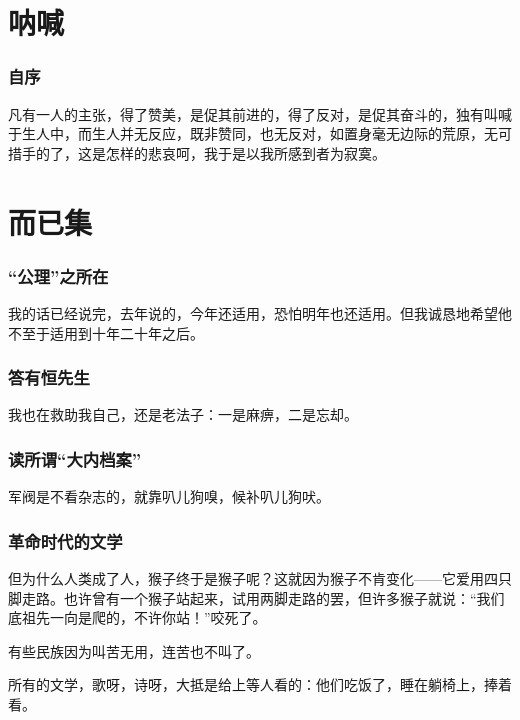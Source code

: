 \documentclass[a4paper]{article}
\begin{document}
    \begin{sloppy}
		\part{呐喊}
		\section{
			自序		
		} {
            \setlength{\parindent}{2em}
			凡有一人的主张，得了赞美，是促其前进的，得了反对，是促其奋斗的，独有叫喊于生人中，而生人并无反应，既非赞同，也无反对，如置身毫无边际的荒原，无可措手的了，这是怎样的悲哀呵，我于是以我所感到者为寂寞。
		}
		
	
        \part{而已集}
        \section{
            “公理”之所在
        } {
            \setlength{\parindent}{2em}
            我的话已经说完，去年说的，今年还适用，恐怕明年也还适用。但我诚恳地希望他不至于适用到十年二十年之后。
        }

        \section{
            答有恒先生
        }
        我也在救助我自己，还是老法子：一是麻痹，二是忘却。

        \section{
            读所谓“大内档案”
        }

        军阀是不看杂志的，就靠叭儿狗嗅，候补叭儿狗吠。

        \section{
            革命时代的文学
        }
        但为什么人类成了人，猴子终于是猴子呢？这就因为猴子不肯变化——它爱用四只脚走路。也许曾有一个猴子站起来，试用两脚走路的罢，但许多猴子就说：“我们底祖先一向是爬的，不许你站！”咬死了。

        有些民族因为叫苦无用，连苦也不叫了。

        所有的文学，歌呀，诗呀，大抵是给上等人看的：他们吃饭了，睡在躺椅上，捧着看。


\end{sloppy}
\end{document}
